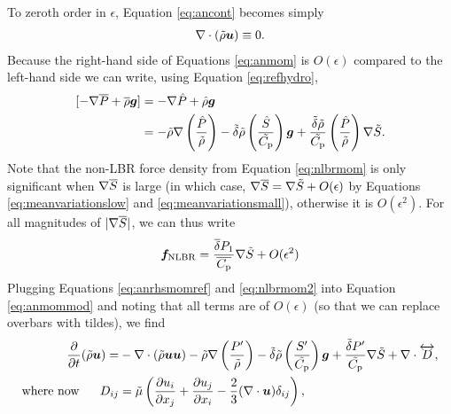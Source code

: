 \documentclass[12pt]{article}
\begin{document}
To zeroth order in $\epsilon$, Equation \eqref{eq:ancont} becomes simply
\begin{align}\label{eq:ancontref}
	\nabla\cdot(\tilde{\rho}\bm{u})\equiv0.
\end{align}
Because the right-hand side of Equations \eqref{eq:anmom} is $O(\epsilon)$ compared to the left-hand side we can write, using Equation \eqref{eq:refhydro},
\begin{align}\label{eq:anrhsmomref}
	[-\nabla \overline{P} + \overline{\rho}\bm{g}] &= -\nabla \hat{P} + \hat{\rho}\bm{g}\nonumber\\
	&= -\tilde{\rho}\nabla\left(\frac{\hat{P}}{\tilde{\rho}}\right) - \tilde{\delta} \tilde{\rho} \left(\frac{\hat{S}}{\tilde{C_{\rm{p}}}}\right) \bm{g} + \frac{\tilde{\delta}\tilde{\rho}}{\tilde{C_{\rm{p}}}} \left(\frac{\hat{P}}{\tilde{\rho}}\right)\nabla\tilde{S}.
\end{align}
Note that the non-LBR force density from Equation \eqref{eq:nlbrmom} is only significant when $\nabla\overline{S}$ is large (in which case, $\nabla\overline{S}=\nabla\tilde{S}+O(\epsilon)$ by Equations \eqref{eq:meanvariationslow} and \eqref{eq:meanvariationsmall}), otherwise it is $O(\epsilon^2)$. For all magnitudes of $|\nabla\overline{S}|$, we can thus write
\begin{align}\label{eq:nlbrmom2}
	\bm{f}_{\rm NLBR} = \frac{\overline{\delta} P_1}{\overline{C_{\rm{p}}}} \nabla\tilde{S} + O(\epsilon^2)
\end{align}
Plugging Equations \eqref{eq:anrhsmomref} and \eqref{eq:nlbrmom2} into Equation \eqref{eq:anmommod} and noting that all terms are of $O(\epsilon)$ (so that we can replace overbars with tildes), we find
\begin{subequations}\label{eq:anmomref}
	\begin{align}\label{eq:anmomrefmain}
	\frac{\partial}{\partial t}(\tilde{\rho}\bm{u})= &-\nabla\cdot(\tilde{\rho}\bm{u}\bm{u}) -\tilde{\rho}\nabla\left(\frac{P^\prime}{\tilde{\rho}}\right) - \tilde{\delta}\tilde{\rho} \left(\frac{S^\prime}{\tilde{C_{\rm{p}}}}\right) \bm{g} +\frac{\tilde{\delta} P^\prime}{\tilde{C_{\rm{p}}}} \nabla\tilde{S}+\nabla\cdot \overleftrightarrow{D},\\
	\text{where now}\ \ \ \ \  D_{ij}& = \tilde{\mu}\left(\frac{\partial u_i}{\partial x_j} + \frac{\partial u_j}{\partial x_i} - \frac{2}{3}(\nabla\cdot\bm{u})\delta_{ij}\right)\label{eq:anmomrefvisc},
\end{align}
\end{subequations}
\end{document}
